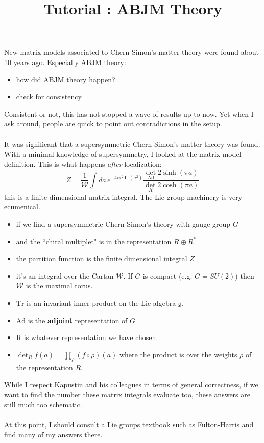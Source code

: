 \documentclass[12pt]{article}
\title{Tutorial : ABJM Theory}
\date{}
\begin{document}
\selectfont \fontsize{12.5}{15}\selectfont

\maketitle

\noindent New matrix models associated to Chern-Simon's matter theory were found about 10 years ago. Especially ABJM theory: 
\begin{itemize}
\item how did ABJM theory happen?
\item check for consistency
\end{itemize}
Consistent or not, this has not stopped a wave of results up to now.  Yet when I ask around, people are quick to point out contradictions in the setup. \\ \\
It was significant that a supersymmetric Chern-Simon's matter theory was found.  With a minimal knowledge of supersymmetry, I looked at the matrix model definition. This is what happens \textit{after} localization:
$$ Z = \frac{1}{\mathcal{W}} \int da \, e^{- 4 i \pi^2 \text{Tr}(a^2)} \frac{\det_{\text{Ad}}2 \sinh (\pi a) }{\det_R 2 \cosh (\pi a)} $$
this is a finite-dimensional matrix integral.  The Lie-group machinery is very ecumenical.  
\begin{itemize}
\item if we find a supersymmetric Chern-Simon's theory with gauge group $G$ 
\item and the ``chiral multiplet" is in the representation $R \oplus R^*$
\item the partition function is the finite dimensional integral $Z$
\item it's an integral over the Cartan $\mathcal{W}$.  If $G$ is compact (e.g. $G = SU(2)$) then $\mathcal{W}$ is the maximal torus.
\item $\text{Tr}$ is an invariant inner product on the Lie algebra $\mathfrak{g}$.
\item $\text{Ad}$ is the \textbf{adjoint} representation of $G$
\item $\text{R}$ is whatever representation we have chosen. 
\item $\det_R f(a) = \prod_\rho (f \circ \rho )(a)$ where the product is over the weights $\rho$ of the representation $R$. 
\end{itemize}
While I respect Kapustin and his colleagues in terms of general correctness, if we want to find the number these matrix integrals evaluate too, these answers are still much too schematic. \\ \\
At this point, I should consult a Lie groups textbook such as Fulton-Harris and find many of my answers there.  
\end{document}

